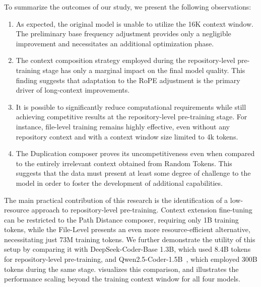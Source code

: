 To summarize the outcomes of our study, we present the following observations:

\begin{enumerate}
\item As expected, the original model is unable to utilize the 16K context window. The preliminary base frequency adjustment provides only a negligible improvement and necessitates an additional optimization phase.
\item The context composition strategy employed during the repository-level pre-training stage has only a marginal impact on the final model quality. This finding suggests that adaptation to the RoPE adjustment is the primary driver of long-context improvements.
\item It is possible to significantly reduce computational requirements while still achieving competitive results at the repository-level pre-training stage. For instance, file-level training remains highly effective, even without any repository context and with a context window size limited to 4k tokens.
\item The Duplication composer proves its uncompetitiveness even when compared to the entirely irrelevant context obtained from Random Tokens. This suggests that the data must present at least some degree of challenge to the model in order to foster the development of additional capabilities.
\end{enumerate}

The main practical contribution of this research is the identification of a low-resource approach to repository-level pre-training. Context extension fine-tuning can be restricted to the Path Distance composer, requiring only 1B training tokens, while the File-Level presents an even more resource-efficient alternative, necessitating just 73M training tokens. We further demonstrate the utility of this setup by comparing it with DeepSeek-Coder-Base 1.3B, which used 8.4B tokens for repository-level pre-training, and Qwen2.5-Coder-1.5B~\parencite{hui2024}, which employed 300B tokens during the same stage.  visualizes this comparison, and  illustrates the performance scaling beyond the training context window for all four models.

